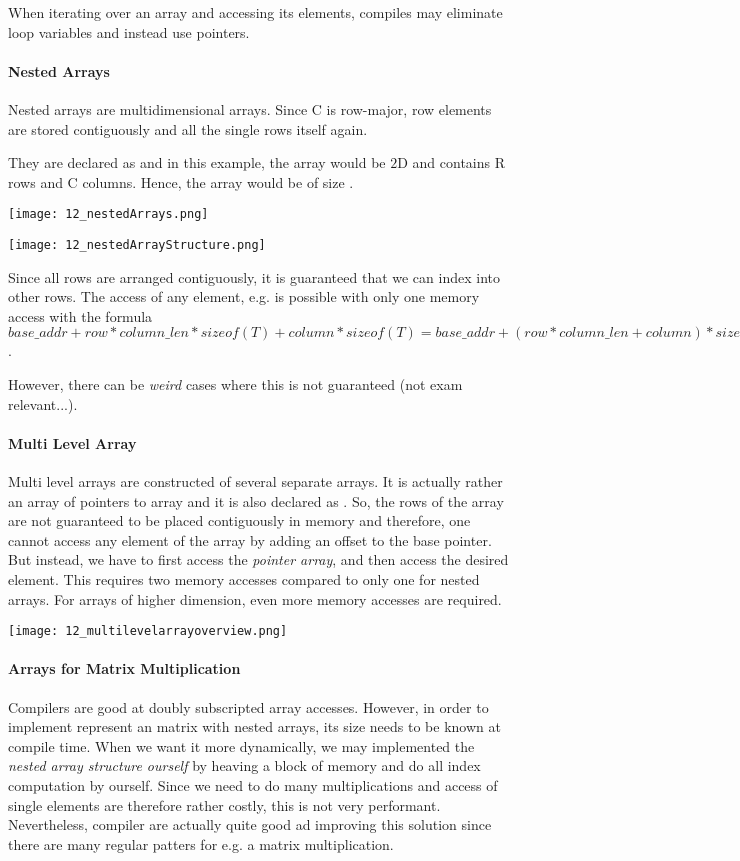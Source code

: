 When iterating over an array and accessing its elements, compiles may eliminate loop variables and instead use pointers.

\paragraph{Nested Arrays}
Nested arrays are multidimensional arrays. Since C is row-major, row elements are stored contiguously and all the single rows itself again.

They are declared as  and in this example, the array would be $2$D and contains R rows and C columns. Hence, the array would be of size .

\texttt{[image: 12\_nestedArrays.png]}

\texttt{[image: 12\_nestedArrayStructure.png]}

Since all rows are arranged contiguously, it is guaranteed that we can index into other rows. The access of any element, e.g.  is possible with only one memory access with the formula $base\_addr + row * column\_len * sizeof(T) + column * sizeof(T) = base\_addr + (row * column\_len + column) * sizeof(T)$.

However, there can be \textit{weird} cases where this is not guaranteed (not exam relevant...).

\paragraph{Multi Level Array}
Multi level arrays are constructed of several separate arrays. It is actually rather an array of pointers to array and it is also declared as . So, the rows of the array are not guaranteed to be placed contiguously in memory and therefore, one cannot access any element of the array by adding an offset to the base pointer. But instead, we have to first access the \textit{pointer array}, and then access the desired element. This requires two memory accesses compared to only one for nested arrays. For arrays of higher dimension, even more memory accesses are required.

\texttt{[image: 12\_multilevelarrayoverview.png]}

\paragraph{Arrays for Matrix Multiplication}
Compilers are good at doubly subscripted array accesses. However, in order to implement represent an matrix with nested arrays, its size needs to be known at compile time. When we want it more dynamically, we may implemented the \textit{nested array structure ourself} by heaving a block of memory and do all index computation by ourself. Since we need to do many multiplications and access of single elements are therefore rather costly, this is not very performant. Nevertheless, compiler are actually quite good ad improving this solution since there are many regular patters for e.g. a matrix multiplication.

